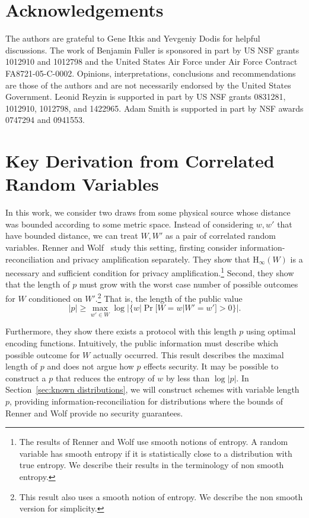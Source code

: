 \documentclass[11pt]{article}
\newcommand{\secref}[1]{\mbox{Section~\ref{#1}}}
\newcommand{\Hoo}{\mathrm{H}_\infty}
\newcommand{\blind}[1]{{#1}}
\newcommand{\blind}[1]{}
\begin{document}
\blind{
\section*{Acknowledgements}
The authors are grateful to Gene Itkis and Yevgeniy Dodis for helpful discussions.
The work of Benjamin Fuller is sponsored in part by US NSF grants 1012910 and 1012798 and  the United States Air Force under Air Force Contract FA8721-05-C-0002. Opinions, interpretations, conclusions and recommendations are those of the authors and are not necessarily endorsed by the United States Government. 
Leonid Reyzin is supported in part by US NSF grants 0831281, 1012910, 1012798, and 1422965.  Adam Smith is supported in part by NSF awards 0747294 and 0941553.
}




\appendix

\section{Key Derivation from Correlated Random Variables}
\label{sec:corr variables}

In this work, we consider two draws from some physical source whose distance was bounded according to some metric space.
Instead of considering $w, w'$ that have bounded distance, we can treat $W, W'$ as a pair of correlated random variables.  
  Renner and Wolf~\cite{DBLP:conf/asiacrypt/RennerW05} study this setting, firsting consider information-reconciliation and privacy amplification separately.  They show that $\Hoo(W)$ is a necessary and sufficient condition for privacy amplification.\footnote{The results of Renner and Wolf use smooth notions of entropy.  A random variable has smooth entropy if it is statistically close to a distribution with true entropy. We describe their results in the terminology of non smooth entropy.}  Second, they show that the length of $p$ must grow with the worst case number of possible outcomes for $W$ conditioned on $W'$.\footnote{This result also uses a smooth notion of entropy.  We describe the non smooth version for simplicity.}  That is, the length of the public value \[|p|\ge \max_{w'\in W} \log |\{w | \Pr[W=w | W'=w']>0\}|.\]

Furthermore, they show there exists a protocol with this length $p$ using optimal encoding functions.  Intuitively, the public information must describe which possible outcome for $W$ actually occurred. This result describes the maximal length of $p$ and does not argue how $p$ effects security.  It may be possible to construct a $p$ that reduces the entropy of $w$ by less than $\log |p|$.  In \secref{sec:known distributions}, we will construct schemes with variable length $p$, providing information-reconciliation for distributions where the bounds of Renner and Wolf provide no security guarantees.
\end{document}
